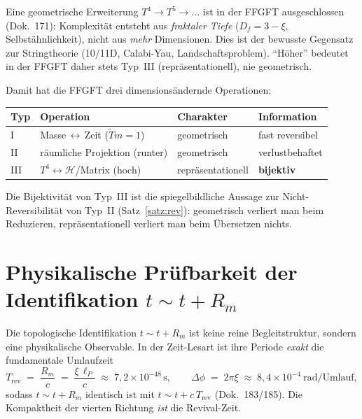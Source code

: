 \begin{remark}
Eine geometrische Erweiterung $T^4 \to T^5 \to \dots$ ist in der FFGFT
ausgeschlossen (Dok.~171): Komplexit\"at entsteht aus \emph{fraktaler Tiefe}
($D_f = 3-\xi$, Selbst\"ahnlichkeit), nicht aus \emph{mehr} Dimensionen. Dies
ist der bewusste Gegensatz zur Stringtheorie (10/11D, Calabi-Yau,
Landschaftsproblem). ``H\"oher'' bedeutet in der FFGFT daher stets Typ~III
(repr\"asentationell), nie geometrisch.
\end{remark}

Damit hat die FFGFT drei dimensions\"andernde Operationen:

\begin{center}
\begin{tabular}{llll}
\hline
\textbf{Typ} & \textbf{Operation} & \textbf{Charakter} & \textbf{Information} \\
\hline
I & Masse\,$\leftrightarrow$\,Zeit ($\tilde T m=1$) & geometrisch & fast reversibel \\
II & r\"aumliche Projektion (runter) & geometrisch & verlustbehaftet \\
III & $T^4\leftrightarrow\mathcal{H}$/Matrix (hoch) & repr\"asentationell & \textbf{bijektiv} \\
\hline
\end{tabular}
\end{center}

\noindent
Die Bijektivit\"at von Typ~III ist die spiegelbildliche Aussage zur
Nicht-Reversibilit\"at von Typ~II (Satz~\ref{satz:rev}): geometrisch verliert
man beim Reduzieren, repr\"asentationell verliert man beim \"Ubersetzen nichts.

\section{Physikalische Pr\"ufbarkeit der Identifikation $t\sim t+R_m$}

Die topologische Identifikation $t \sim t + R_m$ ist keine reine
Begleitstruktur, sondern eine physikalische Observable. In der Zeit-Lesart ist
ihre Periode \emph{exakt} die fundamentale Umlaufzeit
\[
  T_\text{rev} \;=\; \frac{R_m}{c} \;=\; \frac{\xi\,\ell_P}{c}
  \;\approx\; 7{,}2\times10^{-48}\,\text{s},
  \qquad
  \Delta\phi \;=\; 2\pi\xi \;\approx\; 8{,}4\times10^{-4}\ \text{rad/Umlauf},
\]
sodass $t\sim t+R_m$ identisch ist mit $t\sim t+c\,T_\text{rev}$ (Dok.~183/185).
Die Kompaktheit der vierten Richtung \emph{ist} die Revival-Zeit.

